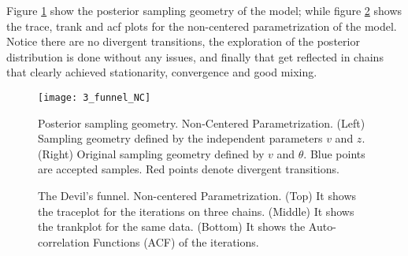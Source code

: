 {Figure \ref{fig:devil_NC_geom} show the posterior sampling geometry of the model; while figure \ref{fig:devil_NC} shows the trace, trank and acf plots for the non-centered parametrization of the model. Notice there are no divergent transitions, the exploration of the posterior distribution is done without any issues, and finally that get reflected in chains that clearly achieved stationarity, convergence and good mixing.
%
\begin{figure}[h]
	\centering
	\texttt{[image: 3\_funnel\_NC]}
	\caption[Posterior sampling geometry. Non-Centered Parametrization.]%
	{Posterior sampling geometry. Non-Centered Parametrization. (Left) Sampling geometry defined by the independent parameters $v$ and $z$. (Right) Original sampling geometry defined by $v$ and $\theta$. Blue points are accepted samples. Red points denote divergent transitions.}
	\label{fig:devil_NC_geom}
\end{figure}
%
\begin{figure}[h]
	\centering
	\begin{subfigure}
		\texttt{[image: 3\_trace\_NC]}
	\end{subfigure}
	\begin{subfigure}
		\texttt{[image: 3\_trank\_NC]}
	\end{subfigure}
	\begin{subfigure}
		\texttt{[image: 3\_acf\_NC]}
	\end{subfigure}
	\caption[The Devil's funnel. Non-centered Parametrization.]%
	{The Devil's funnel. Non-centered Parametrization. (Top) It shows the traceplot for the iterations on three chains. (Middle) It shows the trankplot for the same data. (Bottom) It shows the Auto-correlation Functions (ACF) of the iterations.}
	\label{fig:devil_NC}
\end{figure}
}

